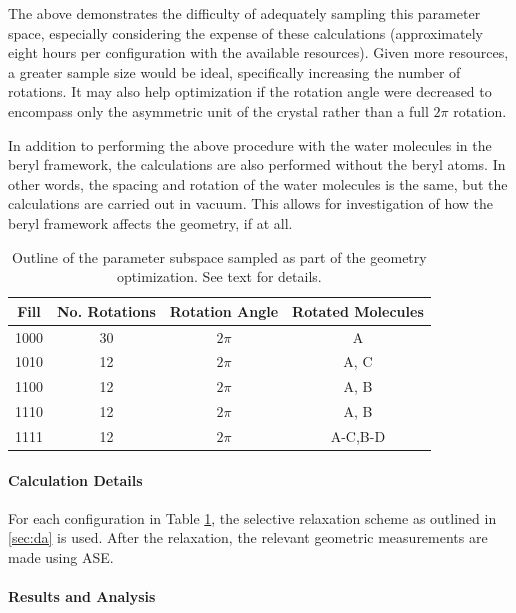     The above demonstrates the difficulty of adequately sampling this parameter space, especially considering the expense of these calculations (approximately eight hours per configuration with the available resources). Given more resources, a greater sample size would be ideal, specifically increasing the number of rotations. It may also help optimization if the rotation angle were decreased to encompass only the asymmetric unit of the crystal rather than a full $2\pi$ rotation.
    
    In addition to performing the above procedure with the water molecules in the beryl framework, the calculations are also performed without the beryl atoms. In other words, the spacing and rotation of the water molecules is the same, but the calculations are carried out in vacuum. This allows for investigation of how the beryl framework affects the geometry, if at all.
    
    \begin{table}[]
        \centering
        \begin{tabular}{c|c|c|c}
            Fill & No. Rotations & Rotation Angle  & Rotated Molecules  \\
            \hline
            \hline
            1000 & 30 & $2\pi$ & A \\
            1010 & 12 & $2\pi$ & A, C \\
            1100 & 12 & $2\pi$ & A, B \\
            1110 & 12 & $2\pi$ & A, B \\
            1111 & 12 & $2\pi$ & A-C,B-D \\
        \end{tabular}
        \caption{Outline of the parameter subspace sampled as part of the geometry optimization. See text for details.}
        \label{tab:param_subspace}
    \end{table}
        
        \paragraph{Calculation Details}
        
        For each configuration in Table \ref{tab:param_subspace}, the selective relaxation scheme as outlined in \ref{sec:da} is used. After the relaxation, the relevant geometric measurements are made using ASE. 
        
        \paragraph{Results and Analysis}
        \label{sec:geom_opt}
        
